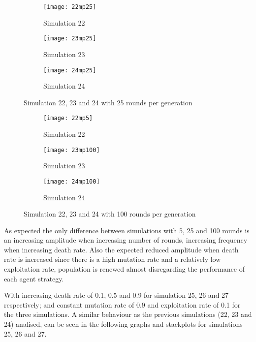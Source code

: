 \begin{figure}[H]       
    \centering
    \begin{subfigure}[b]{0.3\textwidth}
	\centering
	{\texttt{[image: 22mp25]}}   
    	\caption{Simulation 22}
	\label{fig:mpsim2225}
    \end{subfigure}
    \hfill
    \begin{subfigure}[b]{0.3\textwidth}
	\centering
	{\texttt{[image: 23mp25]}}   
    	\caption{Simulation 23}
	\label{fig:mpsim2325}
    \end{subfigure}
    \hfill
    \begin{subfigure}[b]{0.3\textwidth}
	\centering
	{\texttt{[image: 24mp25]}}   
    	\caption{Simulation 24}
	\label{fig:mpsim2425}
    \end{subfigure}
    \caption{Simulation 22, 23 and 24 with 25 rounds per generation}
    \label{mpsim222324simulations25}
\end{figure}


\begin{figure}[H]       
    \centering
    \begin{subfigure}[b]{0.3\textwidth}
	\centering
	{\texttt{[image: 22mp5]}}   
    	\caption{Simulation 22}
	\label{fig:mpsim225}
    \end{subfigure}
    \hfill
    \begin{subfigure}[b]{0.3\textwidth}
	\centering
	{\texttt{[image: 23mp100]}}   
    	\caption{Simulation 23}
	\label{fig:mpsim23100}
    \end{subfigure}
    \hfill
    \begin{subfigure}[b]{0.3\textwidth}
	\centering
	{\texttt{[image: 24mp100]}}   
    	\caption{Simulation 24}
	\label{fig:mpsim24100}
    \end{subfigure}
    \caption{Simulation 22, 23 and 24 with 100 rounds per generation}
    \label{mpsim222324simulations100}
\end{figure}

As expected the only difference between simulations with 5, 25 and 100 rounds is an increasing amplitude when increasing number of rounds, increasing frequency when increasing death rate. Also the expected reduced amplitude when death rate is increased since there is a high mutation rate and a relatively low exploitation rate, population is renewed almost disregarding the performance of each agent strategy.

With increasing death rate of 0.1, 0.5 and 0.9 for simulation 25, 26 and 27 respectively; and constant mutation rate of 0.9 and exploitation rate of 0.1 for the three simulations. A similar behaviour as the previous simulations (22, 23 and 24) analised, can be seen in the following graphs and stackplots for simulations 25, 26 and 27.

